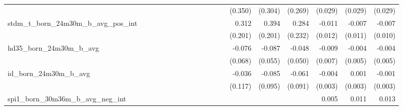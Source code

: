 \begin{tabular}{lrrrrrrrrrrrrrrrrrr}
                                            &              &              &              &              &              &              &              &              &               &              &              &               &      (0.350) &      (0.304) &       (0.269) &      (0.029) &      (0.029) &       (0.029) \\ 
stdm\_t\_born\_24m30m\_b\_avg\_pos\_int     &              &              &              &              &              &              &              &              &               &              &              &               &        0.312 &        0.394 &         0.284 &       -0.011 &       -0.007 &        -0.007 \\ 
                                            &              &              &              &              &              &              &              &              &               &              &              &               &      (0.201) &      (0.201) &       (0.232) &      (0.012) &      (0.011) &       (0.010) \\ 
hd35\_born\_24m30m\_b\_avg                  &              &              &              &              &              &              &              &              &               &              &              &               &       -0.076 &       -0.087 &        -0.048 &       -0.009 &       -0.004 &        -0.004 \\ 
                                            &              &              &              &              &              &              &              &              &               &              &              &               &      (0.068) &      (0.055) &       (0.050) &      (0.007) &      (0.005) &       (0.005) \\ 
id\_born\_24m30m\_b\_avg                    &              &              &              &              &              &              &              &              &               &              &              &               &       -0.036 &       -0.085 &        -0.061 &       -0.004 &        0.001 &        -0.001 \\ 
                                            &              &              &              &              &              &              &              &              &               &              &              &               &      (0.117) &      (0.095) &       (0.091) &      (0.003) &      (0.003) &       (0.003) \\ 
spi1\_born\_30m36m\_b\_avg\_neg\_int        &              &              &              &              &              &              &              &              &               &              &              &               &              &              &               &        0.005 &        0.011 &         0.013 \\ 

\end{tabular}

